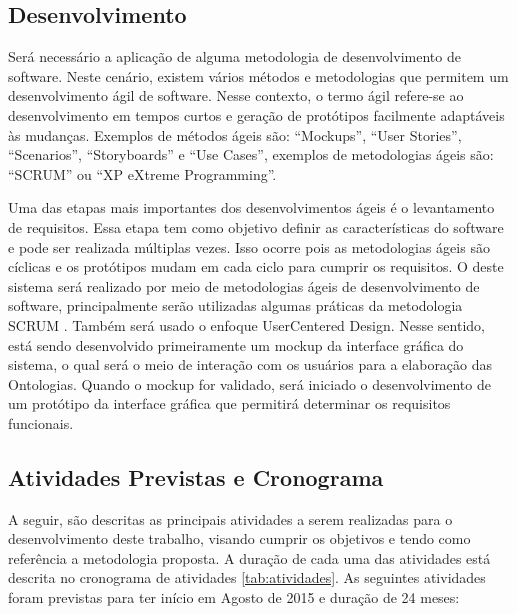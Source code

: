 \subsection{Desenvolvimento}
Será necessário a aplicação de alguma metodologia de desenvolvimento de software. Neste cenário, existem vários métodos e metodologias que permitem um desenvolvimento ágil de software. Nesse contexto, o termo ágil refere-se ao desenvolvimento em tempos curtos e geração de protótipos facilmente adaptáveis às mudanças. Exemplos de métodos ágeis são: “Mockups”, “User Stories”, “Scenarios”, “Storyboards” e “Use Cases”, exemplos de metodologias ágeis são: “SCRUM” ou “XP eXtreme Programming”.

Uma das etapas mais importantes dos desenvolvimentos ágeis é o levantamento de requisitos. Essa etapa tem como objetivo definir as características do software e pode ser realizada múltiplas vezes. Isso ocorre pois as metodologias ágeis são cíclicas e os protótipos mudam em  cada ciclo para cumprir os requisitos. O deste sistema será realizado por meio de metodologias ágeis de desenvolvimento de software, principalmente serão utilizadas algumas práticas da metodologia SCRUM \cite{SchwaberBeedle2002}. Também será usado o enfoque UserCentered Design. Nesse sentido, está sendo desenvolvido primeiramente um mockup da interface gráﬁca do sistema, o qual será o meio de interação com os usuários para a elaboração das Ontologias. Quando o mockup for validado, será iniciado o desenvolvimento de um protótipo da interface gráfica que permitirá determinar os requisitos funcionais. 

\subsection{Atividades Previstas e Cronograma}

A seguir, são descritas as principais atividades a serem realizadas para o desenvolvimento deste trabalho, visando cumprir os objetivos e tendo como referência a metodologia proposta. A duração de cada uma das atividades está descrita no cronograma de atividades \autoref{tab:atividades}. As seguintes atividades foram previstas para ter início em Agosto de 2015 e duração de 24 meses: 


